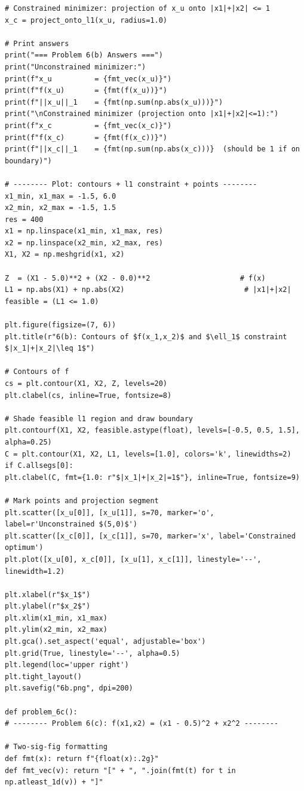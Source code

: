 \documentclass[11pt]{article}
\begin{document}
\begin{lstlisting}
# Constrained minimizer: projection of x_u onto |x1|+|x2| <= 1
x_c = project_onto_l1(x_u, radius=1.0)

# Print answers
print("=== Problem 6(b) Answers ===")
print("Unconstrained minimizer:")
print(f"x_u          = {fmt_vec(x_u)}")
print(f"f(x_u)       = {fmt(f(x_u))}")
print(f"||x_u||_1    = {fmt(np.sum(np.abs(x_u)))}")
print("\nConstrained minimizer (projection onto |x1|+|x2|<=1):")
print(f"x_c          = {fmt_vec(x_c)}")
print(f"f(x_c)       = {fmt(f(x_c))}")
print(f"||x_c||_1    = {fmt(np.sum(np.abs(x_c)))}  (should be 1 if on boundary)")

# -------- Plot: contours + l1 constraint + points --------
x1_min, x1_max = -1.5, 6.0
x2_min, x2_max = -1.5, 1.5
res = 400
x1 = np.linspace(x1_min, x1_max, res)
x2 = np.linspace(x2_min, x2_max, res)
X1, X2 = np.meshgrid(x1, x2)

Z  = (X1 - 5.0)**2 + (X2 - 0.0)**2                     # f(x)
L1 = np.abs(X1) + np.abs(X2)                            # |x1|+|x2|
feasible = (L1 <= 1.0)

plt.figure(figsize=(7, 6))
plt.title(r"6(b): Contours of $f(x_1,x_2)$ and $\ell_1$ constraint $|x_1|+|x_2|\leq 1$")

# Contours of f
cs = plt.contour(X1, X2, Z, levels=20)
plt.clabel(cs, inline=True, fontsize=8)

# Shade feasible l1 region and draw boundary
plt.contourf(X1, X2, feasible.astype(float), levels=[-0.5, 0.5, 1.5], alpha=0.25)
C = plt.contour(X1, X2, L1, levels=[1.0], colors='k', linewidths=2)
if C.allsegs[0]:
plt.clabel(C, fmt={1.0: r"$|x_1|+|x_2|=1$"}, inline=True, fontsize=9)

# Mark points and projection segment
plt.scatter([x_u[0]], [x_u[1]], s=70, marker='o', label=r'Unconstrained $(5,0)$')
plt.scatter([x_c[0]], [x_c[1]], s=70, marker='x', label='Constrained optimum')
plt.plot([x_u[0], x_c[0]], [x_u[1], x_c[1]], linestyle='--', linewidth=1.2)

plt.xlabel(r"$x_1$")
plt.ylabel(r"$x_2$")
plt.xlim(x1_min, x1_max)
plt.ylim(x2_min, x2_max)
plt.gca().set_aspect('equal', adjustable='box')
plt.grid(True, linestyle='--', alpha=0.5)
plt.legend(loc='upper right')
plt.tight_layout()
plt.savefig("6b.png", dpi=200)

def problem_6c():
# -------- Problem 6(c): f(x1,x2) = (x1 - 0.5)^2 + x2^2 --------

# Two-sig-fig formatting
def fmt(x): return f"{float(x):.2g}"
def fmt_vec(v): return "[" + ", ".join(fmt(t) for t in np.atleast_1d(v)) + "]"


\end{lstlisting}
\end{document}
